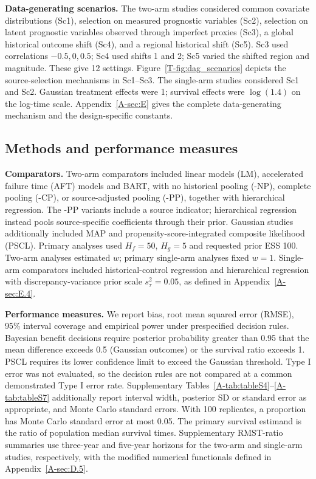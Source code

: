 \documentclass[11pt]{article}
\begin{document}
\noindent\textbf{Data-generating scenarios.}
The two-arm studies considered common covariate distributions (Sc1), selection on measured prognostic variables (Sc2), selection on latent prognostic variables observed through imperfect proxies (Sc3), a global historical outcome shift (Sc4), and a regional historical shift (Sc5). Sc3 used correlations $-0.5,0,0.5$; Sc4 used shifts 1 and 2; Sc5 varied the shifted region and magnitude. These give 12 settings. Figure~\ref{T-fig:dag_scenarios} depicts the source-selection mechanisms in Sc1--Sc3. The single-arm studies considered Sc1 and Sc2. Gaussian treatment effects were 1; survival effects were $\log(1.4)$ on the log-time scale. Appendix~\ref{A-sec:E} gives the complete data-generating mechanism and the design-specific constants.

\subsection{Methods and performance measures}
\noindent\textbf{Comparators.}
Two-arm comparators included linear models (LM), accelerated failure time (AFT) models and BART, with no historical pooling (-NP), complete pooling (-CP), or source-adjusted pooling (-PP), together with hierarchical regression. The -PP variants include a source indicator; hierarchical regression instead pools source-specific coefficients through their prior. Gaussian studies additionally included MAP and propensity-score-integrated composite likelihood (PSCL). Primary \lrc{} analyses used $H_f=50$, $H_g=5$ and requested prior ESS 100. Two-arm analyses estimated $w$; primary single-arm analyses fixed $w=1$. Single-arm comparators included historical-control regression and hierarchical regression with discrepancy-variance prior scale $s_\tau^2=0.05$, as defined in Appendix~\ref{A-sec:E.4}.

\noindent\textbf{Performance measures.}
We report bias, root mean squared error (RMSE), 95\% interval coverage and empirical power under prespecified decision rules. Bayesian benefit decisions require posterior probability greater than 0.95 that the mean difference exceeds 0.5 (Gaussian outcomes) or the survival ratio exceeds 1. PSCL requires its lower confidence limit to exceed the Gaussian threshold. Type I error was not evaluated, so the decision rules are not compared at a common demonstrated Type I error rate. Supplementary Tables~\ref{A-tab:tableS4}--\ref{A-tab:tableS7} additionally report interval width, posterior SD or standard error as appropriate, and Monte Carlo standard errors. With 100 replicates, a proportion has Monte Carlo standard error at most 0.05. The primary survival estimand is the ratio of population median survival times. Supplementary RMST-ratio summaries use three-year and five-year horizons for the two-arm and single-arm studies, respectively, with the modified numerical functionals defined in Appendix~\ref{A-sec:D.5}.
\end{document}
